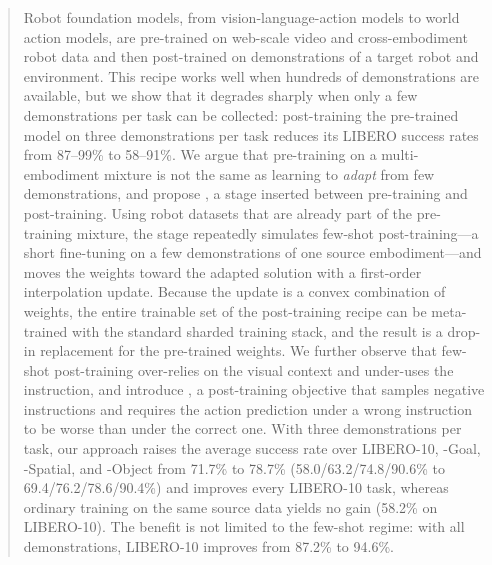 \begin{abstract}
Robot foundation models, from vision-language-action models to world action models, are pre-trained on web-scale video and cross-embodiment robot data and then post-trained on demonstrations of a target robot and environment.
This recipe works well when hundreds of demonstrations are available, but we show that it degrades sharply when only a few demonstrations per task can be collected: post-training the pre-trained \base model on three demonstrations per task reduces its LIBERO success rates from 87--99\% to 58--91\%.
We argue that pre-training on a multi-embodiment mixture is not the same as learning to \emph{adapt} from few demonstrations, and propose \Method, a stage inserted between pre-training and post-training.
Using robot datasets that are already part of the pre-training mixture, the stage repeatedly simulates few-shot post-training---a short fine-tuning on a few demonstrations of one source embodiment---and moves the weights toward the adapted solution with a first-order interpolation update.
Because the update is a convex combination of weights, the entire trainable set of the post-training recipe can be meta-trained with the standard sharded training stack, and the result is a drop-in replacement for the pre-trained weights.
We further observe that few-shot post-training over-relies on the visual context and under-uses the instruction, and introduce \rpl, a post-training objective that samples negative instructions and requires the action prediction under a wrong instruction to be worse than under the correct one.
With three demonstrations per task, our approach raises the average success rate over LIBERO-10, -Goal, -Spatial, and -Object from 71.7\% to 78.7\% (58.0/63.2/74.8/90.6\% to 69.4/76.2/78.6/90.4\%) and improves every LIBERO-10 task, whereas ordinary training on the same source data yields no gain (58.2\% on LIBERO-10).
The benefit is not limited to the few-shot regime: with all demonstrations, LIBERO-10 improves from 87.2\% to 94.6\%.
\end{abstract}
